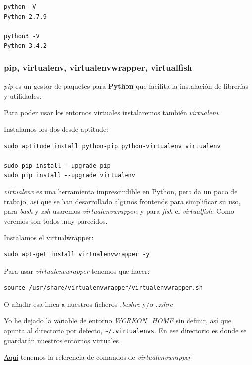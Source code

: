 \documentclass[12pt,spanish,]{scrartcl}
\begin{document}
\begin{verbatim}
python -V
Python 2.7.9

python3 -V
Python 3.4.2
\end{verbatim}

\subsubsection{pip, virtualenv, virtualenvwrapper,
virtualfish}\label{pip-virtualenv-virtualenvwrapper-virtualfish}

\emph{pip} es un gestor de paquetes para \textbf{Python} que facilita la
instalación de librerías y utilidades.

Para poder usar los entornos virtuales instalaremos también
\emph{virtualenv}.

Instalamos los dos desde aptitude:

\begin{verbatim}
sudo aptitude install python-pip python-virtualenv virtualenv

sudo pip install --upgrade pip
sudo pip install --upgrade virtualenv
\end{verbatim}

\emph{virtualenv} es una herramienta imprescindible en Python, pero da
un poco de trabajo, así que se han desarrollado algunos frontends para
simplificar su uso, para \emph{bash} y \emph{zsh} usaremos
\emph{virtualenvwrapper}, y para \emph{fish} el \emph{virtualfish}. Como
veremos son todos muy parecidos.

Instalamos el virtualwrapper:

\begin{verbatim}
sudo apt-get install virtualenvwrapper -y
\end{verbatim}

Para usar \emph{virtualenvwrapper} tenemos que hacer:

\begin{verbatim}
source /usr/share/virtualenvwrapper/virtualenvwrapper.sh
\end{verbatim}

O añadir esa linea a nuestros ficheros \emph{.bashrc} y/o \emph{.zshrc}

Yo he dejado la variable de entorno \emph{WORKON\_HOME} sin definir, así
que apunta al directorio por defecto,
\texttt{\textasciitilde{}/.virtualenvs}. En ese directorio es donde se
guardarán nuestros entornos virtuales.

\href{http://virtualenvwrapper.readthedocs.io/en/latest/command_ref.html}{Aquí}
tenemos la referencia de comandos de \emph{virtualenvwrapper}
\end{document}

